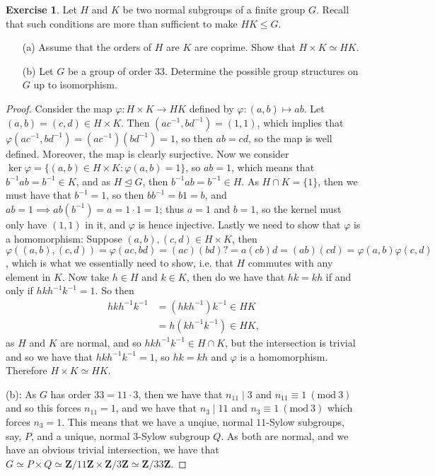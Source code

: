 \documentclass[9pt,reqno]{amsart}
\theoremstyle{definition}
\newtheorem{exercise}{Exercise}[section]
\newcommand{\zz}{\mathbf Z}
\newcommand{\Mod}[1]{\ (\mathrm{mod}\ #1)}
\begin{document}
\begin{exercise} Let $H$ and $K$ be two normal subgroups of a finite group $G$. Recall that such conditions are more than sufficient to make $HK \leq G$. 
\begin{itemize}
	\item[(a)] Assume that the orders of $H$ are $K$ are coprime. Show that $H \times K \simeq HK$.
	\item[(b)] Let $G$ be a group of order $33$. Determine the possible group structures on $G$ up to isomorphism. 
\end{itemize}
\end{exercise}
\begin{proof} Consider the map $\varphi \colon H \times K \to HK$ defined by $\varphi \colon (a,b) \mapsto ab$. Let $(a,b) = (c, d ) \in H \times K$. Then $(ac^{-1}, bd^{-1}) = (1, 1)$, which implies that $\varphi (ac^{-1}, bd^{-1}) = (ac^{-1})(bd^{-1}) = 1$, so then $ab =cd$, so the map is well defined. 	Moreover, the map is clearly surjective. Now we consider $\ker \varphi = \{ (a,b) \in H \times K \colon \varphi (a, b) = 1 \}$, so $ab = 1$, which means that $b^{-1} a b = b^{-1} \in K$, and as $H \trianglelefteq G$, then $b^{-1} a b = b^{-1} \in H$. As $H \cap K = \{1 \}$, then we must have that $b^{-1} =1$, so then $b b^{-1} = b 1 = b$, and $ab = 1 \implies ab(b^{-1}) = a = 1 \cdot 1 = 1$; thus $a = 1$ and $b = 1$, so the kernel must only have $(1, 1)$ in it, and $\varphi$ is hence injective. Lastly we need to show that $\varphi$ is a homomorphism: Suppose $(a, b), (c,d) \in H \times K$, then $\varphi((a,b) , (c,d)) = \varphi(ac, bd) = (ac)(bd) ?= a(cb) d = (ab)(cd) = \varphi(a,b) \varphi (c,d)$, which is what we essentially need to show, i.e. that $H$ commutes with any element in $K$. Now take $h \in H$ and $k \in K$, then do we have that $hk=kh$ if and only if $hk h^{-1} k^{-1} = 1$.  So then 
\begin{align}
	hkh^{-1} k^{-1} &= (hkh^{-1} )k^{-1} \in HK\\
	&= h(kh^{-1}k^{-1}) \in HK, 
\end{align}
as $H$ and $K$ are normal, and so $hkh^{-1} k^{-1} \in H \cap K$, but the intersection is trivial and so we have that $hk h^{-1}k^{-1} = 1$, so $hk = kh$ and $\varphi$ is a homomorphism. Therefore $ H \times K \simeq HK$.

(b): As $G$ has order $33 =11 \cdot 3$, then we have that $n_{11} \mid 3$ and $n_{11} \equiv 1 \Mod{3}$ and so this forces $n_{11}= 1$, and we have that $n_3 \mid 11$ and $n_3 \equiv 1 \Mod{3}$ which forces $n_3 = 1$. This means that we have a unqiue, normal $11$-Sylow subgroups, say, $P$, and a unique, normal $3$-Sylow subgroup $Q$. As both are normal, and we have an obvious trivial intersection, we have that $G \simeq P \times Q \simeq \zz/ 11\zz \times \zz/3\zz \simeq \zz / 33 \zz$. 
\end{proof}	
\end{document}
